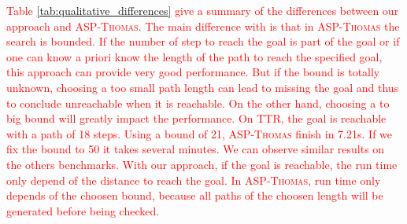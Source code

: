 	\textcolor{red}{
	Table \ref{tab:qualitative_differences} give a summary of the differences between our approach and \textsc{ASP-Thomas}.
	The main difference with is that in \textsc{ASP-Thomas} the search is bounded.
	If the number of step to reach the goal is part of the goal or if one can know a priori know the length of the path to reach the specified goal,
	this approach can provide very good performance.
	But if the bound is totally unknown, choosing a too small path length can lead to missing the goal and thus to conclude unreachable when it is reachable.
	On the other hand, choosing a to big bound will greatly impact the performance.
	On TTR, the goal is reachable with a path of 18 steps.
	Using a bound of 21, \textsc{ASP-Thomas} finish in 7.21s.
	If we fix the bound to 50 it takes several minutes.
	We can observe similar results on the others benchmarks.
	With our approach, if the goal is reachable, the run time only depend of the distance to reach the goal.
	In \textsc{ASP-Thomas}, run time only depends of the choosen bound, because all paths of the choosen length will be generated before being checked.
	}
